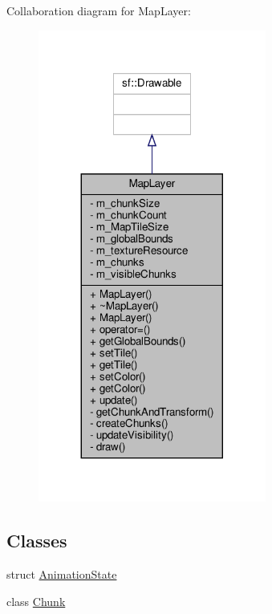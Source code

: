 Collaboration diagram for Map\+Layer\+:
\nopagebreak
\begin{figure}[H]
\begin{center}
\leavevmode
\includegraphics[width=212pt]{classMapLayer__coll__graph}
\end{center}
\end{figure}
\subsection*{Classes}
\begin{DoxyCompactItemize}
\item 
struct \hyperlink{structMapLayer_1_1AnimationState}{Animation\+State}
\item 
class \hyperlink{classMapLayer_1_1Chunk}{Chunk}
\end{DoxyCompactItemize}
